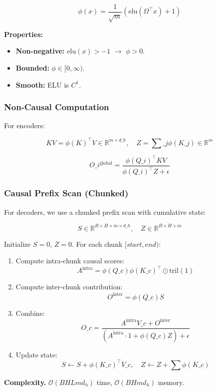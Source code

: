 \[
\phi(x) = \frac{1}{\sqrt{m}} \left(\mathrm{elu}(\Omega^\top x) + 1\right)
\tag{4.4}
\]

\textbf{Properties:}
\begin{itemize}
\item \textbf{Non-negative:} $\mathrm{elu}(x) > -1$ $\to$ $\phi > 0$.
\item \textbf{Bounded:} $\phi \in [0, \infty)$.
\item \textbf{Smooth:} ELU is $C^1$.

\end{itemize}
\subsubsection{Non-Causal Computation}

For encoders:

\[
KV = \phi(K)^\top V \in \mathbb{R}^{m \times d\_h}, \quad
Z = \sum\_j \phi(K\_j) \in \mathbb{R}^m
\tag{4.5}
\]

\[
O\_i^\text{global} = \frac{\phi(Q\_i)^\top KV}{\phi(Q\_i)^\top Z + \epsilon}
\tag{4.6}
\]

\subsubsection{Causal Prefix Scan (Chunked)}

For decoders, we use a chunked prefix scan with cumulative state:

\[
S \in \mathbb{R}^{B \times H \times m \times d\_h}, \quad
Z \in \mathbb{R}^{B \times H \times m}
\]

Initialize $S = 0$, $Z = 0$. For each chunk $[start, end)$:

\begin{enumerate}
\item Compute intra-chunk causal scores:
  $$
  A^\text{intra} = \phi(Q\_c) \phi(K\_c)^\top \odot \text{tril}(1)
  \tag{4.7}
  $$

\item Compute inter-chunk contribution:
  $$
  O^\text{inter} = \phi(Q\_c) S
  \tag{4.8}
  $$

\item Combine:
  $$
  O\_c = \frac{A^\text{intra} V\_c + O^\text{inter}}{(A^\text{intra} \cdot 1 + \phi(Q\_c) Z) + \epsilon}
  \tag{4.9}
  $$

\item Update state:
  $$
  S \leftarrow S + \phi(K\_c)^\top V\_c, \quad Z \leftarrow Z + \sum \phi(K\_c)
  \tag{4.10}
  $$

\end{enumerate}
\textbf{Complexity.} $\mathcal{O}(B H L m d_h)$ time, $\mathcal{O}(B H m d_h)$ memory.

